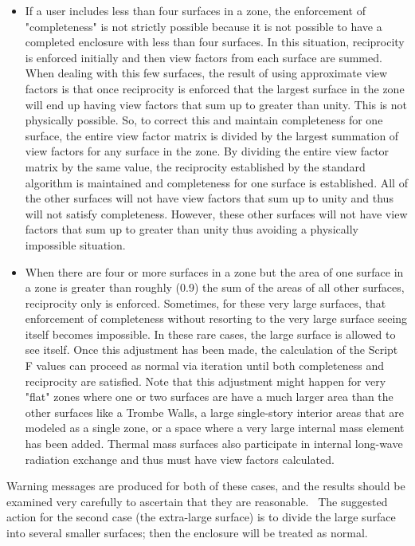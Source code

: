 \begin{itemize}
\item
  If a user includes less than four surfaces in a zone, the enforcement of "completeness" is not strictly possible because it is not possible to have a completed enclosure with less than four surfaces.  In this situation, reciprocity is enforced initially and then view factors from each surface are summed.  When dealing with this few surfaces, the result of using approximate view factors is that once reciprocity is enforced that the largest surface in the zone will end up having view factors that sum up to greater than unity.  This is not physically possible.  So, to correct this and maintain completeness for one surface, the entire view factor matrix is divided by the largest summation of view factors for any surface in the zone.  By dividing the entire view factor matrix by the same value, the reciprocity established by the standard algorithm is maintained and completeness for one surface is established.  All of the other surfaces will not have view factors that sum up to unity and thus will not satisfy completeness.  However, these other surfaces will not have view factors that sum up to greater than unity thus avoiding a physically impossible situation.
\item
  When there are four or more surfaces in a zone but the area of one surface in a zone is greater than roughly (0.9) the sum of the areas of all other surfaces, reciprocity only is enforced.  Sometimes, for these very large surfaces, that enforcement of completeness without resorting to the very large surface seeing itself becomes impossible.  In these rare cases, the large surface is allowed to see itself.  Once this adjustment has been made, the calculation of the Script F values can proceed as normal via iteration until both completeness and reciprocity are satisfied.  Note that this adjustment might happen for very "flat" zones where one or two surfaces are have a much larger area than the other surfaces like a Trombe Walls, a large single-story interior areas that are modeled as a single zone, or a space where a very large internal mass element has been added.  Thermal mass surfaces also participate in internal long-wave radiation exchange and thus must have view factors calculated.
\end{itemize}

Warning messages are produced for both of these cases, and the results should be examined very carefully to ascertain that they are reasonable.~ The suggested action for the second case (the extra-large surface) is to divide the large surface into several smaller surfaces; then the enclosure will be treated as normal.

